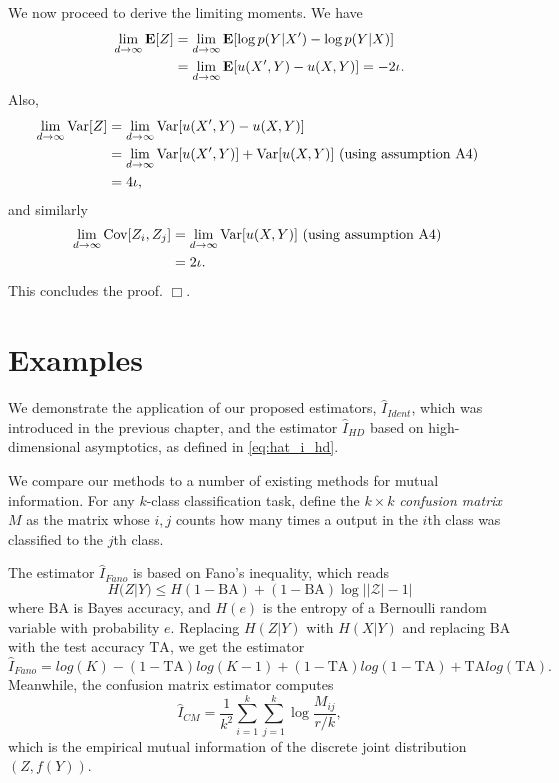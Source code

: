 We now proceed to derive the limiting moments.
We have
\begin{align*}
\lim_{d \to \infty} \textbf{E}[Z] 
&= \lim_{d \to \infty} \textbf{E}[ \log p(Y|X') - \log p(Y|X)]
\\&= \lim_{d \to \infty} \textbf{E}[ u(X', Y) - u(X, Y) ] = -2\iota.
\end{align*}
Also,
\begin{align*}
\lim_{d \to \infty} \text{Var}[Z]
 &= \lim_{d \to \infty} \text{Var}[ u(X', Y) - u(X, Y) ]
\\&= \lim_{d \to \infty} \text{Var}[ u(X', Y)] +\text{Var}[ u(X, Y) ]\text{ (using assumption A4) }
\\&= 4\iota,
\end{align*}
and similarly
\begin{align*}
\lim_{d \to \infty} \text{Cov}[Z_i, Z_j]
&= \lim_{d \to \infty} \text{Var}[ u(X, Y)]\text{ (using assumption A4) }
\\&= 2\iota.
\end{align*}
This concludes the proof. $\Box$.

\section{Examples}

We demonstrate the application of our proposed estimators,
$\hat{I}_{Ident}$, which was introduced in the previous chapter, and
the estimator $\hat{I}_{HD}$ based on high-dimensional asymptotics, as
defined in \eqref{eq:hat_i_hd}.

We compare our methods to a number of existing methods for mutual
information.  For any $k$-class classification task, define the $k
\times k$ \emph{confusion matrix} $M$ as the matrix whose $i, j$
counts how many times a output in the $i$th class was classified to
the $j$th class.

The estimator $\hat{I}_{Fano}$ is based on Fano's inequality, which reads
\[
H(Z|Y) \leq H(1-\text{BA}) + (1-\text{BA}) \log ||\mathcal{Z}| - 1|
\]
where $\text{BA}$ is Bayes accuracy, and $H(e)$ is the entropy of a
Bernoulli random variable with probability $e$.  Replacing $H(Z|Y)$
with $H(X|Y)$ and replacing $\text{BA}$ with the test accuracy $\text{TA}$,
we get the estimator
\[
\hat{I}_{Fano} = log(K) - (1-\text{TA}) log(K-1) + (1-\text{TA}) log(1-\text{TA}) + \text{TA} log(\text{TA}).
\]
Meanwhile, the confusion matrix estimator computes
\[
\hat{I}_{CM} = \frac{1}{k^2} \sum_{i=1}^k \sum_{j=1}^k \log \frac{M_{ij}}{r/k},
\]
which is the empirical mutual information of the discrete joint
distribution $(Z, f(Y))$.

